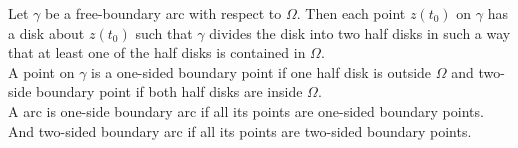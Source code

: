 \begin{definition}
	Let $\gamma$ be a free-boundary arc with respect to $\Omega$.
	Then each point $z(t_0)$ on $\gamma$ has a disk about $z(t_0)$ such that $\gamma$ divides the disk into two half disks in such a way that at least one of the half disks is contained in $\Omega$.\\

	A point on $\gamma$ is a one-sided boundary point if one half disk is outside $\Omega$ and two-side boundary point if both half disks are inside $\Omega$.\\

	A arc is one-side boundary arc if all its points are one-sided boundary points. And two-sided boundary arc if all its points are two-sided boundary points.
\end{definition}

